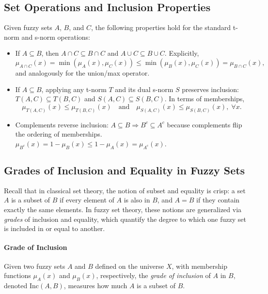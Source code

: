 \subsection{Set Operations and Inclusion Properties}
\label{sec:fuzzysets_set_operations_and_inclusion_properties}

Given fuzzy sets $A$, $B$, and $C$, the following properties hold for the standard t\hyp{}norm and s\hyp{}norm operations:

\begin{itemize}
    \item If $A \subseteq B$, then $A \cap C \subseteq B \cap C$ and $A \cup C \subseteq B \cup C$.
    Explicitly,
    \[
        \mu_{A\cap C}(x) = \min(\mu_A(x),\mu_C(x)) \leq \min(\mu_B(x),\mu_C(x)) = \mu_{B\cap C}(x),
    \]
    and analogously for the union/max operator.
    \item If $A \subseteq B$, applying any t\hyp{}norm $T$ and its dual s\hyp{}norm $S$ preserves inclusion: $T(A, C) \subseteq T(B, C)$ and $S(A, C) \subseteq S(B, C)$. In terms of memberships,
    \[
        \mu_{T(A, C)}(x) \leq \mu_{T(B, C)}(x) \quad \text{and} \quad \mu_{S(A, C)}(x) \leq \mu_{S(B, C)}(x),\; \forall x.
    \]
    \item Complements reverse inclusion: $A \subseteq B \Rightarrow B^c \subseteq A^c$ because complements flip the ordering of memberships.
    \(\mu_{B^c}(x) = 1-\mu_B(x) \leq 1-\mu_A(x) = \mu_{A^c}(x)\).
\end{itemize}
\subsection{Grades of Inclusion and Equality in Fuzzy Sets}
\label{sec:fuzzysets_grades_of_inclusion_and_equality_in_fuzzy_sets}

Recall that in classical set theory, the notion of subset and equality is crisp: a set \( A \) is a subset of \( B \) if every element of \( A \) is also in \( B \), and \( A = B \) if they contain exactly the same elements. In fuzzy set theory, these notions are generalized via \emph{grades} of inclusion and equality, which quantify the degree to which one fuzzy set is included in or equal to another.

\paragraph{Grade of Inclusion}

Given two fuzzy sets \( A \) and \( B \) defined on the universe \( X \), with membership functions \(\mu_A(x)\) and \(\mu_B(x)\), respectively, the \emph{grade of inclusion} of \( A \) in \( B \), denoted \( \mathrm{Inc}(A, B) \), measures how much \( A \) is a subset of \( B \).

